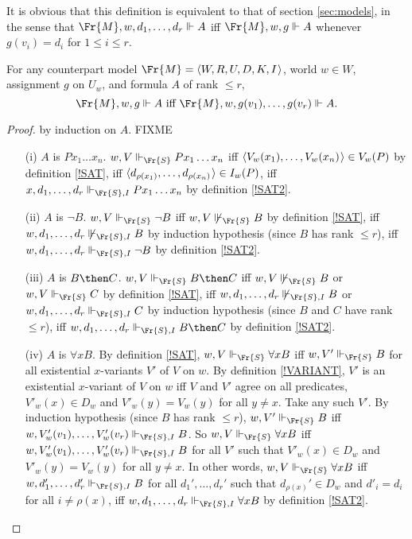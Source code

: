 \documentclass[11pt]{woarticle}
\theoremstyle{break}
\theoremstyle{nonumberplain}
\newcommand{\SAT}{\Vdash}
\newcommand{\1}{\;\,|\;\,}
\renewcommand{\t}[1]{\ensuremath{\langle #1  \makebox[.2ex]{}\rangle}}
\begin{document}
It is obvious that this definition is equivalent to that of section
\ref{sec:models}, in the sense that $\Fr{M},w,d_{1},\ldots,d_{r} \SAT A$ iff
$\Fr{M},w,g \SAT A$ whenever $g(v_{i})=d_{i}$ for $1\leq i \leq r$.

\begin{lemma}{\label{truthandsat}}
  For any counterpart model $\Fr{M} = \t{W,R,U,D,K,I}$, world $w\in W$,
  assignment $g$ on $U_{w}$, and formula $A$ of rank $\leq r$, 
  \[
  \Fr{M},w,g \SAT A \text{ iff } \Fr{M},w,g(v_{1}),\ldots,g(v_{r}) \SAT A.
  \]
\end{lemma}

\begin{proof} by induction on  $A$.
  FIXME
  \begin{itemize}

  \item[(i)] $A$ is $Px_1\ldots x_n$. $w,V \SAT_{\Fr{S}} Px_1\ldots
    x_n$ iff $\t{V_w(x_1),\ldots,V_w(x_n)} \in V_w(P)$ by definition
    \ref{!SAT}, iff $\t{d_{\rho(x_1)},\ldots,d_{\rho(x_n)}} \in
    I_w(P)$, iff $x,d_1,\ldots,d_r \SAT_{\Fr{S},I} Px_1\ldots x_n$ by
    definition \ref{!SAT2}.

  \item[(ii)] $A$ is $\neg B$. $w,V \SAT_{\Fr{S}} \neg B$ iff $w,V
    \not\SAT_{\Fr{S}} B$ by definition \ref{!SAT}, iff
    $w,d_1,\ldots,d_r \not\SAT_{\Fr{S},I} B$ by induction hypothesis
    (since $B$ has rank $\leq r$), iff $w,d_1,\ldots,d_r
    \SAT_{\Fr{S},I} \neg B$ by definition \ref{!SAT2}.

  \item[(iii)] $A$ is $B \then C$. $w,V \SAT_{\Fr{S}} B \then C$ iff
    $w,V \not\SAT_{\Fr{S}} B$ or $w,V \SAT_{\Fr{S}} C$ by definition
    \ref{!SAT}, iff $w,d_1,\ldots,d_r \not\SAT_{\Fr{S},I} B$ or
    $w,d_1,\ldots,d_r \SAT_{\Fr{S},I} C$ by induction hypothesis
    (since $B$ and $C$ have rank $\leq r$), iff $w,d_1,\ldots,d_r
    \SAT_{\Fr{S},I} B \then C$ by definition \ref{!SAT2}.

  \item[(iv)] $A$ is $\forall x B$. By definition \ref{!SAT}, $w,V
    \SAT_{\Fr{S}} \forall x B$ iff $w,V'\SAT_{\Fr{S}} B$ for all
    existential $x$-variants $V'$ of $V$ on $w$. By definition
    \ref{!VARIANT}, $V'$ is an existential $x$-variant of $V$ on $w$
    iff $V$ and $V'$ agree on all predicates, $V'_w(x) \in D_w$ and
    $V'_w(y)=V_w(y)$ for all $y\not=x$. Take any such $V'$. By
    induction hypothesis (since $B$ has rank $\leq r$), $w,V'
    \SAT_{\Fr{S}} B$ iff $w,V'_w(v_1),\ldots,V_w'(v_r) \SAT_{\Fr{S},I}
    B$. So $w,V \SAT_{\Fr{S}} \forall x B$ iff
    $w,V'_w(v_1),\ldots,V_w'(v_r) \SAT_{\Fr{S},I} B$ for all $V'$ such
    that $V'_w(x) \in D_w$ and $V'_w(y)=V_w(y)$ for all $y\not=x$. In
    other words, $w,V \SAT_{\Fr{S}} \forall x B$ iff
    $w,d_1',\ldots,d_r' \SAT_{\Fr{S},I} B$ for all $d_1',\ldots,d_r'$
    such that $d_{\rho(x)}' \in D_w$ and $d'_i=d_i$ for all
    $i\not=\rho(x)$, iff $w,d_1,\ldots,d_r \SAT_{\Fr{S},I} \forall xB$
    by definition \ref{!SAT2}.


\end{itemize}
\end{proof}
\end{document}
